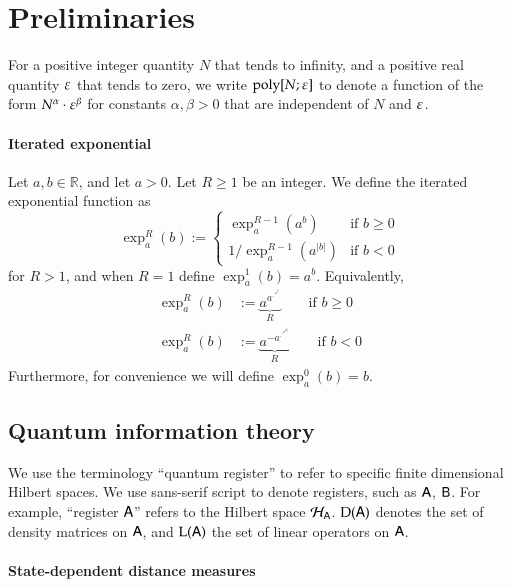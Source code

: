 

\section{Preliminaries}

For a positive integer quantity $N$ that tends to infinity, and a positive real quantity $\varepsilon$ that tends to zero, we write $\operatorname{poly}[N;\varepsilon]$ to denote a function of the form $N^\alpha \cdot \varepsilon^\beta$ for constants $\alpha, \beta > 0$ that are independent of $N$ and $\varepsilon$.

\paragraph{Iterated exponential}
Let $a,b \in \mathbb{R}$, and let $a > 0$. Let $R \geq 1$ be an integer. We define the iterated exponential function as
\[
	\exp^R_a(b) := 
	\left \{ \begin{array}{ll}
		\exp^{R-1}_a(a^b)	& \mbox{if } b \geq 0 \\
		1/\exp^{R-1}_a(a^{|b|}) & \mbox {if } b < 0
	\end{array}
	\right.
\]
for $R > 1$, and when $R=1$ define $\exp^1_a(b) = a^b$. Equivalently, 
\begin{align*}
	\exp^R_a(b) &:= \underbrace{a^{a^{\cdot^{\cdot^{a^b}}}}}_{R} \qquad \mbox{if } b \geq 0 \\
	\exp^R_a(b) &:= \underbrace{a^{-a^{\cdot^{\cdot^{a^{|b|}}}}}}_{R} \qquad \mbox{if } b < 0
\end{align*}
Furthermore, for convenience we will define $\exp^0_a(b) = b$.%

\subsection{Quantum information theory}

We use the terminology ``quantum register'' to refer to specific finite dimensional Hilbert spaces. We use sans-serif script to denote registers, such as ${\mathsf{A}}$, ${\mathsf{B}}$. For example, ``register ${\textsf{A}}$'' refers to the Hilbert space $\mathcal{H}_{{\textsf{A}}}$. 
$\mathrm{D}({\mathsf{A}})$ denotes the set of density matrices on ${\mathsf{A}}$, and $\mathrm{L}({\mathsf{A}})$ the set of linear operators on ${\mathsf{A}}$.

\paragraph{State-dependent distance measures}

